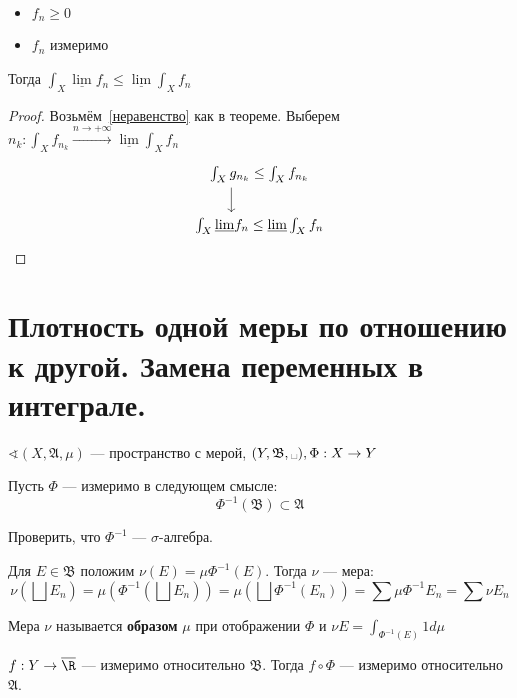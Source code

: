 \begin{corollary}\itemfix
    \begin{itemize}
        \item \(f_n \geq 0\)
        \item \(f_n\) измеримо
    \end{itemize}

    Тогда \(\int_X \underline\lim f_n \leq \underline\lim \int_X f_n\)
\end{corollary}
\begin{proof}
    Возьмём~\eqref{неравенство} как в теореме. Выберем \(n_k : \int_X f_{n_k} \xrightarrow{n \to +\infty} \underline\lim \int_X f_n\)
    \[
        \begin{tikzcd}[ampersand replacement=\&, column sep=small]
            \int_X g_{n_k} \arrow[swap,shift right=2em]{d}{} \leq \int_X f_{n_k} \\
            \int_X \underline\lim f_n \leq \underline\lim \int_X f_n
        \end{tikzcd}
    \]
\end{proof}

\section{Плотность одной меры по отношению к другой. Замена переменных в интеграле.}

\(\sphericalangle (X, \mathfrak{A}, \mu)\) --- пространство с мерой, \((Y, \mathfrak{B}, \text{\textvisiblespace}), \Phi : X \to Y\)

Пусть \(\Phi\) --- измеримо в следующем смысле:
\[\Phi^{ - 1}(\mathfrak{B})\subset \mathfrak{A}\]

\begin{exercise}
    Проверить, что \(\Phi^{-1}\) --- \(\sigma\)-алгебра. %
\end{exercise}

Для \(E\in \mathfrak{B}\) положим \(\nu(E) = \mu\Phi^{-1}(E)\). Тогда \(\nu\) --- мера:
\[\nu\left(\bigsqcup E_n\right) = \mu(\Phi^{-1}\left(\bigsqcup E_n\right)) = \mu\left(\bigsqcup \Phi^{-1}(E_n)\right) = \sum \mu \Phi^{-1} E_n = \sum \nu E_n\]

Мера \(\nu\) называется \textbf{образом} \(\mu\) при отображении \(\Phi\) и \(\nu E = \int_{\Phi^{-1}(E)} 1 d\mu\)

\begin{observation}
    \label{об измеримости}
    \(f : Y \to \overline\R\) --- измеримо относительно \(\mathfrak{B}\). Тогда \(f \circ \Phi\) --- измеримо относительно \(\mathfrak{A}\).
\end{observation}

